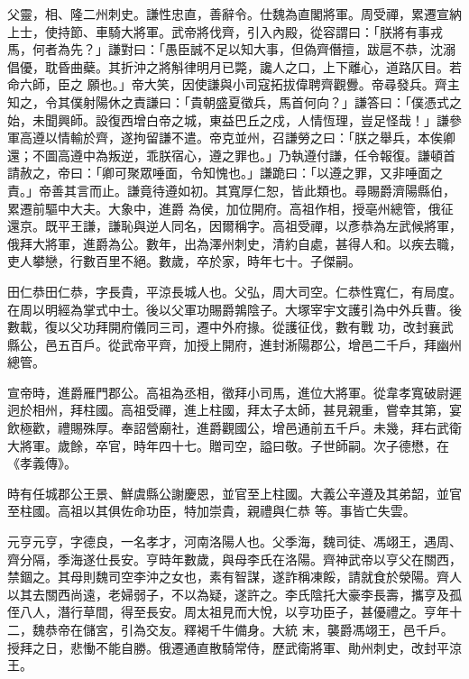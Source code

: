 \begin{pinyinscope}
 父靈，相、隆二州刺史。謙性忠直，善辭令。仕魏為直閣將軍。周受禪，累遷宣納上士，使持節、車騎大將軍。武帝將伐齊，引入內殿，從容謂曰：「朕將有事戎馬，何者為先？」謙對曰：「愚臣誠不足以知大事，但偽齊僭擅，跋扈不恭，沈溺倡優，耽昏曲蘗。其折沖之將斛律明月已斃，讒人之口，上下離心，道路仄目。若命六師，臣之
 願也。」帝大笑，因使謙與小司寇拓拔偉聘齊觀釁。帝尋發兵。齊主知之，令其僕射陽休之責謙曰：「貴朝盛夏徵兵，馬首何向？」謙答曰：「僕憑式之始，未聞興師。設復西增白帝之城，東益巴丘之戍，人情恆理，豈足怪哉！」謙參軍高遵以情輸於齊，遂拘留謙不遣。帝克並州，召謙勞之曰：「朕之舉兵，本俟卿還；不圖高遵中為叛逆，乖朕宿心，遵之罪也。」乃執遵付謙，任令報復。謙頓首請赦之，帝曰：「卿可聚眾唾面，令知愧也。」謙跪曰：「以遵之罪，又非唾面之責。」帝善其言而止。謙竟待遵如初。其寬厚仁恕，皆此類也。尋賜爵濟陽縣伯，累遷前驅中大夫。大象中，進爵
 為侯，加位開府。高祖作相，授亳州總管，俄征還京。既平王謙，謙恥與逆人同名，因爾稱字。高祖受禪，以彥恭為左武候將軍，俄拜大將軍，進爵為公。數年，出為澤州刺史，清約自處，甚得人和。以疾去職，吏人攀戀，行數百里不絕。數歲，卒於家，時年七十。子傑嗣。



 田仁恭田仁恭，字長貴，平涼長城人也。父弘，周大司空。仁恭性寬仁，有局度。在周以明經為掌式中士。後以父軍功賜爵鶉陰子。大塚宰宇文護引為中外兵曹。後數載，復以父功拜開府儀同三司，遷中外府掾。從護征伐，數有戰
 功，改封襄武縣公，邑五百戶。從武帝平齊，加授上開府，進封淅陽郡公，增邑二千戶，拜幽州總管。



 宣帝時，進爵雁門郡公。高祖為丞相，徵拜小司馬，進位大將軍。從韋孝寬破尉遲迥於相州，拜柱國。高祖受禪，進上柱國，拜太子太師，甚見親重，嘗幸其第，宴飲極歡，禮賜殊厚。奉詔營廟社，進爵觀國公，增邑通前五千戶。未幾，拜右武衛大將軍。歲餘，卒官，時年四十七。贈司空，謚曰敬。子世師嗣。次子德懋，在《孝義傳》。



 時有任城郡公王景、鮮虞縣公謝慶恩，並官至上柱國。大義公辛遵及其弟韶，並官至柱國。高祖以其俱佐命功臣，特加崇貴，親禮與仁恭
 等。事皆亡失雲。



 元亨元亨，字德良，一名孝才，河南洛陽人也。父季海，魏司徒、馮翊王，遇周、齊分隔，季海遂仕長安。亨時年數歲，與母李氏在洛陽。齊神武帝以亨父在關西，禁錮之。其母則魏司空李沖之女也，素有智謀，遂詐稱凍餒，請就食於滎陽。齊人以其去關西尚遠，老婦弱子，不以為疑，遂許之。李氏陰托大豪李長壽，攜亨及孤侄八人，潛行草間，得至長安。周太祖見而大悅，以亨功臣子，甚優禮之。亨年十二，魏恭帝在儲宮，引為交友。釋褐千牛備身。大統
 末，襲爵馮翊王，邑千戶。授拜之日，悲慟不能自勝。俄遷通直散騎常侍，歷武衛將軍、勛州刺史，改封平涼王。




\end{pinyinscope}
